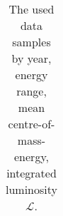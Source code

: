 {\begin{table}[htbp]
\begin{tabular}{|c|c|c|c|}
\hline
\end{tabular}
\caption{The used data samples by year, energy range, mean centre-of-mass-energy, integrated luminosity ${\mathcal L}$.}
\label{tab:luminocity}
\end{table}
}




\newcommand{\TABmontecarloX}{
\begin{table}[htbp]\centering
\begin{tabular}{|c|c|c|c|c|}\hline
$\sqrt{s},\GeV$       &  Pythia~6.1 & Herwig~6.2 & KoralW~1.42 & KoralW~1.42  \\
& $e^+e^-\rightarrow Z/\gamma,$     & $e^+e^-\rightarrow Z/\gamma,$     &  $e^+e^-\rightarrow W^+W^-,$ &  $e^+e^-\rightarrow W^+W^-,$ \\
& $Z/\gamma\rightarrow \mathrm{hadrons}$ & $Z/\gamma\rightarrow \mathrm{hadrons}$ &  $W^+W^-\rightarrow qqqq$ &  $W^+W^-\rightarrow qqll$ \\
\hline\hline
 $130.1$ & & & &  \\
\hline
\end{tabular}
\caption{
A summary on the used Monte Carlo samples.
}
\label{tab:montecarlo}
\end{table}
}




